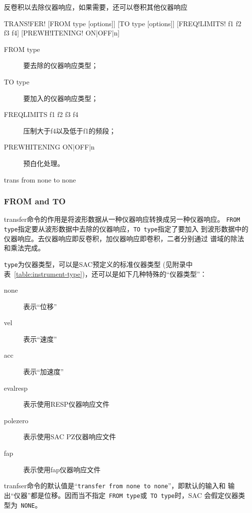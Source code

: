 \label{cmd:transfer}

反卷积以去除仪器响应，如果需要，还可以卷积其他仪器响应

\begin{SACSTX}
TRANS!FER! [FROM type [options]] [TO type [options]]
    [FREQ!LIMITS! f1 f2 f3 f4] [PREWH!ITENING! ON|OFF|n]
\end{SACSTX}

\begin{description}
\item [FROM type] 要去除的仪器响应类型；
\item [TO type] 要加入的仪器响应类型；
\item [FREQLIMITS f1 f2 f3 f4] 压制大于f4以及低于f1的频段；
\item [PREWHITENING ON|OFF|n] 预白化处理。
\end{description}

\begin{SACDFT}
trans from none to none
\end{SACDFT}

\subsubsection{FROM and TO}
transfer命令的作用是将波形数据从一种仪器响应转换成另一种仪器响应。
\verb+FROM type+指定要从波形数据中去除的仪器响应，\verb+TO type+指定了要加入
到波形数据中的仪器响应。去仪器响应即反卷积，加仪器响应即卷积，二者分别通过
谱域的除法和乘法完成。

\verb+type+为仪器类型，可以是SAC预定义的标准仪器类型
(见附录中表~\ref{table:instrument-type})，还可以是如下几种特殊的``仪器类型''：
\begin{description}
\item [none] 表示``位移''
\item [vel] 表示``速度''
\item [acc] 表示``加速度''
\item [evalresp] 表示使用RESP仪器响应文件
\item [polezero] 表示使用SAC PZ仪器响应文件
\item [fap] 表示使用fap仪器响应文件
\end{description}

tranfser命令的默认值是``\verb+transfer from none to none+''，即默认的输入和
输出``仪器''都是位移。因而当不指定~\verb+FROM type+或~\verb+TO type+时，SAC
会假定仪器类型为~\verb+NONE+。

